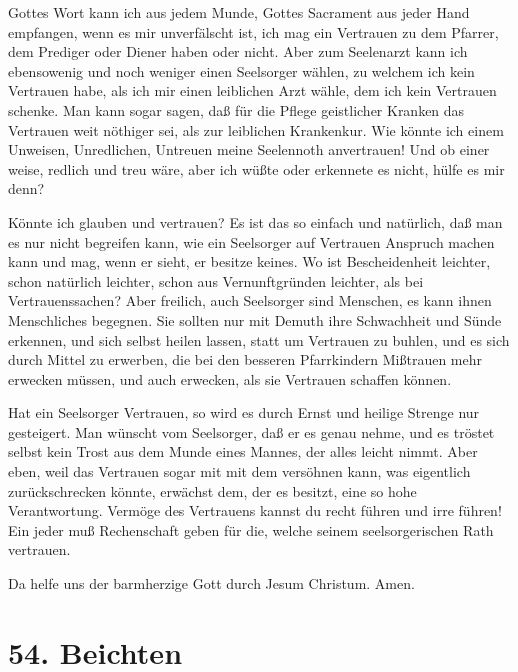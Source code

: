 Gottes Wort kann ich aus jedem Munde, Gottes Sacrament aus jeder Hand empfangen, wenn es mir unverfälscht ist, ich mag ein Vertrauen zu dem Pfarrer, dem Prediger oder Diener haben oder nicht. Aber zum Seelenarzt kann ich ebensowenig und noch weniger einen Seelsorger wählen, zu welchem ich kein Vertrauen habe, als ich mir einen leiblichen Arzt wähle, dem ich kein Vertrauen schenke. Man kann sogar sagen, daß für die Pflege geistlicher Kranken das Vertrauen weit nöthiger sei, als zur leiblichen Krankenkur. Wie könnte ich einem Unweisen, Unredlichen, Untreuen meine Seelennoth anvertrauen! Und ob einer weise, redlich und treu wäre, aber ich wüßte oder erkennete es nicht, hülfe es mir denn?

Könnte ich glauben und vertrauen? Es ist das so einfach und natürlich, daß man es nur nicht begreifen kann, wie ein Seelsorger auf Vertrauen Anspruch machen kann und mag, wenn er sieht, er besitze keines. Wo ist Bescheidenheit leichter, schon natürlich leichter, schon aus Vernunftgründen leichter, als bei Vertrauenssachen? Aber freilich, auch Seelsorger sind Menschen, es kann ihnen Menschliches begegnen. Sie sollten nur mit Demuth ihre Schwachheit und Sünde erkennen, und sich selbst heilen lassen, statt um Vertrauen zu buhlen, und es sich durch Mittel zu erwerben, die bei den besseren Pfarrkindern Mißtrauen mehr erwecken müssen, und auch erwecken, als sie Vertrauen schaffen können.

Hat ein Seelsorger Vertrauen, so wird es durch Ernst und heilige Strenge nur gesteigert. Man wünscht vom Seelsorger, daß er es genau nehme, und es tröstet selbst kein Trost aus dem Munde eines Mannes, der alles leicht nimmt. Aber eben, weil das Vertrauen sogar mit mit dem versöhnen kann, was eigentlich zurückschrecken könnte, erwächst dem, der es besitzt, eine so hohe Verantwortung. Vermöge des Vertrauens kannst du recht führen und irre führen! Ein jeder muß Rechenschaft geben für die, welche seinem seelsorgerischen Rath vertrauen.

Da helfe uns der barmherzige Gott durch Jesum Christum. Amen.

\section{54. Beichten}

